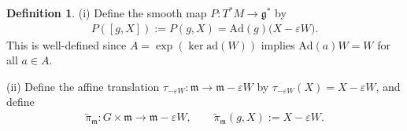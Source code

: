\documentclass[11pt]{amsart}
\theoremstyle{definition}
\newtheorem{definition}[theorem]{Definition}
\theoremstyle{plain}
\theoremstyle{conclusion}
\begin{document}
\begin{definition}
\label{def:maps}
\textup{(i)} Define the smooth map $P:T^*M \rightarrow \mathfrak{g}^*$ by
\begin{align*}
P([g,X]):= P(g,X) =\mathrm{Ad}(g)\bigl(X-\varepsilon W\bigr).
\end{align*}
This is well-defined since $A = \exp(\ker\mathrm{ad}(W))$ implies $\mathrm{Ad}(a)W = W$ for all $a \in A$.

\textup{(ii)} Define the affine translation $\tau_{-\varepsilon W}:\mathfrak{m} \to \mathfrak{m} - \varepsilon W$ by $\tau_{-\varepsilon W}(X)=X-\varepsilon W$, and define
\begin{align*}
\widetilde{\pi}_{\mathfrak{m}}:G\times\mathfrak{m}\to\mathfrak{m}-\varepsilon W,\qquad \widetilde{\pi}_{\mathfrak{m}}(g,X):=X-\varepsilon W.
\end{align*}

\end{definition}
\end{document}
